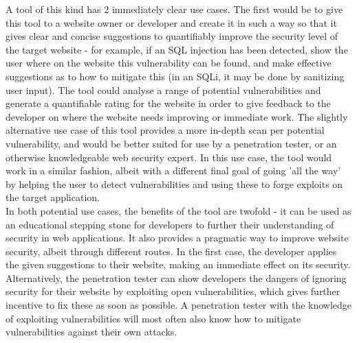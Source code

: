 A tool of this kind has 2 immediately clear use cases. 
The first would be to give this tool to a website owner or developer and create it in such a way so that it gives clear and concise suggestions to quantifiably improve the security level of the target website - for example, if an SQL injection has been detected, show the user where on the website this vulnerability can be found, and make effective suggestions as to how to mitigate this (in an SQLi, it may be done by sanitizing user input). The tool could analyse a range of potential vulnerabilities and generate a quantifiable rating for the website in order to give feedback to the developer on where the website needs improving or immediate work.
The slightly alternative use case of this tool provides a more in-depth scan per potential vulnerability, and would be better suited for use by a penetration tester, or an otherwise knowledgeable web security expert. In this use case, the tool would work in a similar fashion, albeit with a different final goal of going 'all the way' by helping the user to detect vulnerabilities and using these to forge exploits on the target application. \\ 
 
In both potential use cases, the benefits of the tool are twofold - it can be used as an educational stepping stone for developers to further their understanding of security in web applications. It also provides a pragmatic way to improve website security, albeit through different routes. In the first case, the developer applies the given suggestions to their website, making an immediate effect on its security. Alternatively, the penetration tester can  show developers the dangers of ignoring security for their website by exploiting open vulnerabilities, which gives further incentive to fix these as soon as possible. A penetration tester with the knowledge of exploiting vulnerabilities will most often also know how to mitigate vulnerabilities against their own attacks. \\


